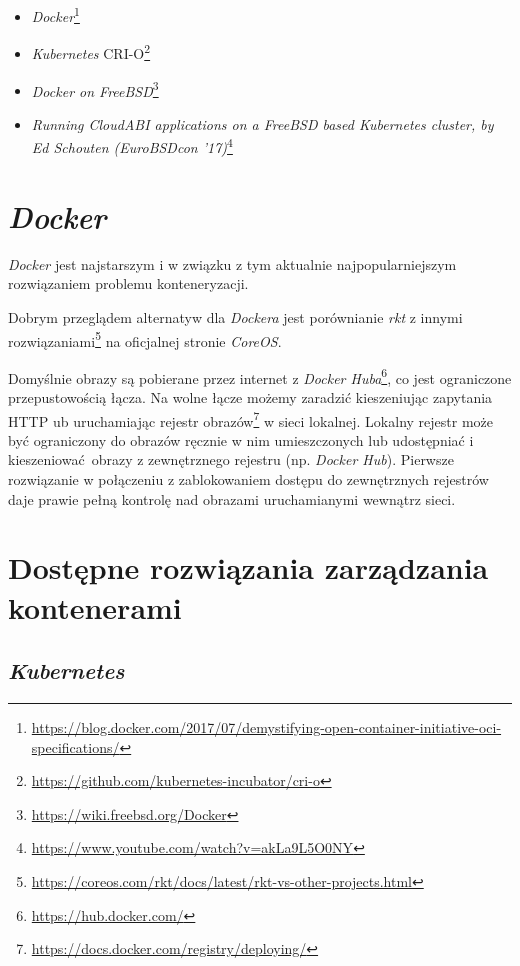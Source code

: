 \documentclass[a4paper,12pt,twoside,openany]{report}
\providecommand{\tightlist}{%
  \setlength{\itemsep}{0pt}\setlength{\parskip}{0pt}}
\DeclareRobustCommand{\href}[2]{#2\footnote{\url{#1}}}
\begin{document}
\begin{itemize}
\tightlist
\item
  \href{https://blog.docker.com/2017/07/demystifying-open-container-initiative-oci-specifications/}{\emph{Docker}}
\item
  \href{https://github.com/kubernetes-incubator/cri-o}{\emph{Kubernetes}
  CRI-O}
\item
  \href{https://wiki.freebsd.org/Docker}{\emph{Docker on FreeBSD}}
\item
  \href{https://www.youtube.com/watch?v=akLa9L5O0NY}{\emph{Running
  CloudABI applications on a FreeBSD based Kubernetes cluster, by Ed
  Schouten (EuroBSDcon '17)}}
\end{itemize}

\hypertarget{docker}{%
\section{\texorpdfstring{\emph{Docker}}{Docker}}\label{docker}}

\emph{Docker} jest najstarszym i w związku z tym aktualnie
najpopularniejszym rozwiązaniem problemu konteneryzacji.

Dobrym przeglądem alternatyw dla \emph{Dockera} jest
\href{https://coreos.com/rkt/docs/latest/rkt-vs-other-projects.html}{porównianie
\emph{rkt} z innymi rozwiązaniami} na oficjalnej stronie \emph{CoreOS}.

Domyślnie obrazy są pobierane przez internet z
\href{https://hub.docker.com/}{\emph{Docker Huba}}, co jest ograniczone
przepustowością łącza. Na wolne łącze możemy zaradzić kieszeniując
zapytania HTTP ub uruchamiając
\href{https://docs.docker.com/registry/deploying/}{rejestr obrazów} w
sieci lokalnej. Lokalny rejestr może być ograniczony do obrazów ręcznie
w nim umieszczonych lub udostępniać i kieszeniować~obrazy z zewnętrznego
rejestru (np. \emph{Docker Hub}). Pierwsze rozwiązanie w połączeniu z
zablokowaniem dostępu do zewnętrznych rejestrów daje prawie pełną
kontrolę nad obrazami uruchamianymi wewnątrz sieci.

\hypertarget{dostux119pne-rozwiux105zania-zarzux105dzania-kontenerami}{%
\section{Dostępne rozwiązania zarządzania
kontenerami}\label{dostux119pne-rozwiux105zania-zarzux105dzania-kontenerami}}

\hypertarget{kubernetes}{%
\subsection{\texorpdfstring{\emph{Kubernetes}}{Kubernetes}}\label{kubernetes}}
\end{document}
